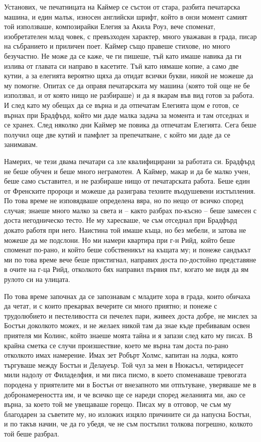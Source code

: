 \documentclass[12pt]{book}
\begin{document}
Установих, че печатницата на Каймер се състои от стара, разбита печатарска машина, и един малък, износен английски шрифт, който в онзи момент самият той използваше, композирайки Елегия за Акила Роуз, вече споменат, изобретателен млад човек, с превъзходен характер, много уважаван в града, писар на събранието и приличен поет. Каймер също правеше стихове, но много безучастно. Не може да се каже, че ги пишеше, тъй като имаше навика да ги излива от главата си направо в касетите. Тъй като нямаше копие, а само две кутии, а за елегията вероятно щяха да отидат всички букви, никой не можеше да му помогне. Опитах се да оправя печатарската му машина (която той още не бе използвал, и от която нищо не разбираше) и да я вкарам във вид готов за работа. И  след като му обещах да се върна и да отпечатам Елегията щом е готов, се върнах при Брадфърд, който ми даде малка задача за момента и там отседнах и се хранех. След няколко дни Каймер ме повика да отпечатам Елегията. Сега беше получил още две кутий и памфлет за препечатване, с който ми даде да се занимавам.

Намерих, че тези двама печатари са зле квалифицирани за работата си. Брадфърд не беше обучен и беше много неграмотен. А Каймер, макар и да бе малко учен, беше само съставител, и не разбираше нищо от печатарската работа. Беше един от Френските пророци и можеше да разиграва техните въодушевени изстъпления. По това време не изповядваше определена вяра, но по нещо от всичко според случая; знаеше много малко за света и – както разбрах по-късно – беше замесен с доста негодническо тесто. Не му харесваше, че съм отседнал при Брадфърд докато работя при него. Наистина той имаше къща, но без мебели, и затова не можеше да ме подслони. Но ми намери квартира при г-н Рийд, който беше споменат по-рано, и който беше собственикът на къщата му; и понеже сандъкът ми по това време вече беше пристигнал, направих доста по-достойно представяне в очите на г-ца Рийд, отколкото бях направил първия път, когато ме видя да ям рулото си на улицата. 

По това време започнах да се запознавам с младите хора в града, които обичаха да четат, и с които прекарвах вечерите си много приятно; и понеже с трудолюбието и пестеливостта си печелех пари, живеех доста добре, не мислех за Бостън доколкото можех, и не желаех никой там да знае къде пребивавам освен приятеля ми Колинс, който знаеше моята тайна и я запази след като му писах. В крайна сметка се случи произшествие, което ме върна там доста по-рано отколкото имах намерение. Имах зет  Робърт Холмс, капитан на лодка, която търгуваше между Бостън и Делауеър. Той чул за мен в Нюкасъл, четиридесет мили надолу от Филаделфия, и ми писа писмо, в което споменаваше тревогата породена у приятелите ми в Бостън от внезапното ми отпътуване, уверяваше ме в добронамереността им, и че всичко ще се нареди според желанията ми, ако се върна, за което той ме увещаваше горещо. Писах му в отговор, че съм му благодарен за съветите му, но изложих изцяло причините си да напусна Бостън, и по такъв начин, че да го убедя, че не съм постъпил толкова погрешно, колкото той беше разбрал.
\end{document}
